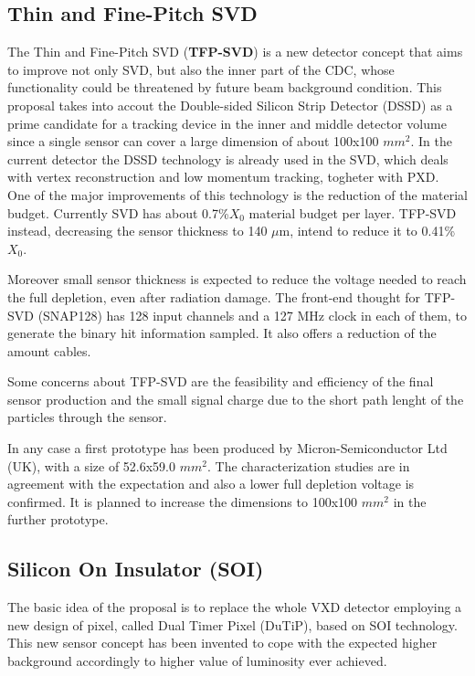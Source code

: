 \subsection{Thin and Fine-Pitch SVD}

The Thin and Fine-Pitch SVD (\textbf{TFP-SVD}) is a new detector concept that aims to improve not only SVD, but also the inner part of the CDC, whose functionality could be threatened by future beam background condition.
This proposal takes into accout the Double-sided Silicon Strip Detector (DSSD) as a prime candidate for a tracking device in the inner and middle detector volume since a single sensor can cover a large dimension of about 100x100 $mm^{2}$. In the current detector the DSSD technology is already used in the SVD, which deals with vertex reconstruction and low momentum tracking, togheter with PXD.\\

One of the major improvements of this technology is the reduction of the material budget.
Currently SVD has about 0.7\%$X_{0}$ material budget per layer. TFP-SVD instead, decreasing the sensor thickness to 140 $\mu$m, intend to reduce it to 0.41\%$X_{0}$. 

Moreover small sensor thickness is expected to reduce the voltage needed to reach the full depletion, even after radiation damage. 
The front-end thought for TFP-SVD (SNAP128) has 128 input channels and a 127 MHz clock in each of them, to generate the binary hit information sampled. It also offers a reduction of the amount cables.

Some concerns about TFP-SVD are the feasibility and efficiency of the final sensor production and the small signal charge due to the short path lenght of the particles through the sensor.

In any case a first prototype has been produced by Micron-Semiconductor Ltd (UK), with a size of 52.6x59.0 $mm^{2}$. The characterization studies are in agreement with the expectation and also a lower full depletion voltage is confirmed. It is planned to increase the dimensions to 100x100 $mm^{2}$ in the further prototype.


\subsection{Silicon On Insulator (SOI)}

The basic idea of the proposal is to replace the whole VXD detector employing a new design of pixel, called Dual Timer Pixel (DuTiP), based on SOI technology. This new sensor concept has been invented to cope with the expected higher background accordingly to higher value of luminosity ever achieved.


